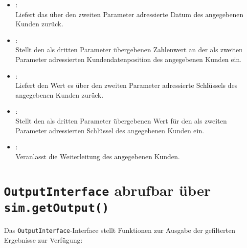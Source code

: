 \begin{itemize}
\item
{}:\\
Liefert das über den zweiten Parameter adressierte Datum des angegebenen Kunden zurück.

\item
{}:\\
Stellt den als dritten Parameter übergebenen Zahlenwert an der als zweiten Parameter adressierten Kundendatenposition des angegebenen Kunden ein.

\item
{}:\\
Liefert den Wert es über den zweiten Parameter adressierte Schlüssels des angegebenen Kunden zurück.

\item
{}:\\
Stellt den als dritten Parameter übergebenen Wert für den als zweiten Parameter adressierten Schlüssel des angegebenen Kunden ein.

\item
{}:\\
Veranlasst die Weiterleitung des angegebenen Kunden.

\end{itemize}



\chapter{\texttt{OutputInterface} abrufbar über \texttt{sim.getOutput()}}

Das \texttt{OutputInterface}-Interface stellt Funktionen zur Ausgabe der gefilterten Ergebnisse zur Verfügung:

